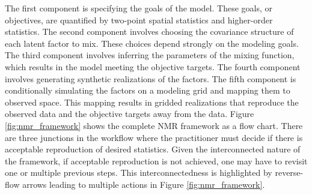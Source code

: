 The first component is specifying the goals of the model. These goals, or objectives, are quantified by two-point spatial statistics and higher-order statistics. The second component involves choosing the covariance structure of each latent factor to mix. These choices depend strongly on the modeling goals. The third component involves inferring the parameters of the mixing function, which results in the model meeting the objective targets. The fourth component involves generating synthetic realizations of the factors. The fifth component is conditionally simulating the factors on a modeling grid and mapping them to observed space. This mapping results in gridded realizations that reproduce the observed data and the objective targets away from the data. Figure \ref{fig:nmr_framework} shows the complete \gls{NMR} framework as a flow chart. There are three junctions in the workflow where the practitioner must decide if there is acceptable reproduction of desired statistics. Given the interconnected nature of the framework, if acceptable reproduction is not achieved, one may have to revisit one or multiple previous steps. This interconnectedness is highlighted by reverse-flow arrows leading to multiple actions in Figure \ref{fig:nmr_framework}. 

